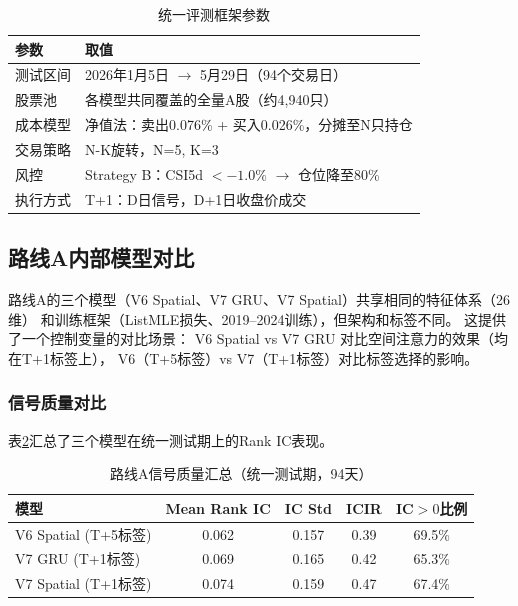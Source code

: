 \documentclass[12pt,a4paper]{ctexart}
\begin{document}
\begin{table}[htbp]
\centering
\caption{统一评测框架参数}
\label{tab:unified_framework}
\begin{tabular}{ll}
\toprule
参数 & 取值 \\
\midrule
测试区间 & 2026年1月5日 $\to$ 5月29日（94个交易日） \\
股票池 & 各模型共同覆盖的全量A股（约4,940只） \\
成本模型 & 净值法：卖出0.076\% + 买入0.026\%，分摊至N只持仓 \\
交易策略 & N-K旋转，N=5, K=3 \\
风控 & Strategy B：CSI5d $< -1.0\%$ $\to$ 仓位降至80\% \\
执行方式 & T+1：D日信号，D+1日收盘价成交 \\
\bottomrule
\end{tabular}
\end{table}

\subsection{路线A内部模型对比}

路线A的三个模型（V6 Spatial、V7 GRU、V7 Spatial）共享相同的特征体系（26维）
和训练框架（ListMLE损失、2019--2024训练），但架构和标签不同。
这提供了一个控制变量的对比场景：
V6 Spatial vs V7 GRU 对比空间注意力的效果（均在T+1标签上），
V6（T+5标签）vs V7（T+1标签）对比标签选择的影响。

\subsubsection{信号质量对比}

表\ref{tab:ch5_ic_summary}汇总了三个模型在统一测试期上的Rank IC表现。

\begin{table}[htbp]
\centering
\caption{路线A信号质量汇总（统一测试期，94天）}
\label{tab:ch5_ic_summary}
\begin{tabular}{lcccc}
\toprule
模型 & Mean Rank IC & IC Std & ICIR & IC$>0$比例 \\
\midrule
V6 Spatial (T+5标签) & 0.062 & 0.157 & 0.39 & 69.5\% \\
V7 GRU (T+1标签) & 0.069 & 0.165 & 0.42 & 65.3\% \\
V7 Spatial (T+1标签) & 0.074 & 0.159 & 0.47 & 67.4\% \\
\bottomrule
\end{tabular}
\end{table}
\end{document}
